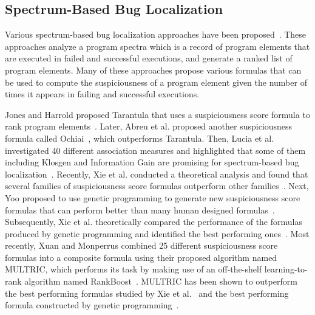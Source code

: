\subsection{Spectrum-Based Bug Localization} 

Various spectrum-based bug localization approaches have been proposed~\cite{JH05,Abreu:2009,LuciaLJB10,LuciaLJTB14, Libl+05,LYFHM05,Artzi2010,Artzi:2010:PFL:1806799.1806840,ZH02,Zeller2002a,CZ05,LuciaLX14}. These approaches analyze a program spectra which is a record of program elements that are executed in failed and successful executions, and generate a ranked list of program elements. Many of these approaches propose various formulas that can be used to compute the suspiciousness of a program element given the number of times it appears in failing and successful executions.

Jones and Harrold proposed Tarantula that uses a suspiciousness score formula to rank program elements~\cite{JH05}. Later, Abreu et al. proposed another suspiciousness formula called Ochiai~\cite{Abreu:2009}, which outperforms Tarantula. Then, Lucia et al. investigated 40 different association measures and highlighted that some of them including Klosgen and Information Gain are promising for spectrum-based bug localization~\cite{LuciaLJB10,LuciaLJTB14}. Recently, Xie et al. conducted a theoretical analysis and found that several families of suspiciousness score formulas outperform other families~\cite{XieCKX13}. Next, Yoo proposed to use genetic programming to generate new suspiciousness score formulas that can perform better than many human designed formulas~\cite{Yoo12}. Subsequently, Xie et al. theoretically compared the performance of the formulas produced by genetic programming and identified the best performing ones~\cite{XieKCYH13}. Most recently, Xuan and Monperrus combined 25 different suspiciousness score formulas into a composite formula using their proposed algorithm named MULTRIC, which performs its task by making use of an off-the-shelf learning-to-rank algorithm named RankBoost~\cite{XuanM14}. MULTRIC has been shown to outperform the best performing formulas studied by Xie et al.~\cite{XieCKX13} and the best performing formula constructed by genetic programming~\cite{Yoo12,XieKCYH13}.


